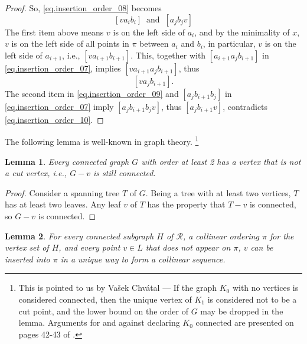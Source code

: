 \documentclass[12pt]{article}
\newtheorem{lem}{Lemma}
\begin{document}
\begin{proof}
So, \eqref{eq.insertion_order_08} becomes
\begin{equation}\label{eq.insertion_order_09}
[va_ib_i] \;\; \mbox{and} \;\; [a_jb_jv]
\end{equation}
The first item above means $v$ is on the left side of $a_i$,
and by the minimality of $x$, $v$ is on the left side of all points
in $\pi$ between $a_i$ and $b_i$,
in particular, $v$ is on the left side of $a_{i+1}$,
i.e.,
$[va_{i+1}b_{i+1}]$.
This, together with $[a_{i+1} a_j b_{i+1}]$ in \eqref{eq.insertion_order_07}, 
implies $[va_{i+1} a_j b_{i+1}]$, thus
\begin{equation}\label{eq.insertion_order_10}
[va_jb_{i+1}].
\end{equation}
The second item in \eqref{eq.insertion_order_09} and
$[a_jb_{i+1}b_j]$ in \eqref{eq.insertion_order_07}
imply $[a_j b_{i+1} b_j v]$, thus $[a_j b_{i+1} v]$, contradicts
\eqref{eq.insertion_order_10}.
\end{proof}

The following lemma is well-known in graph theory.
\footnote{
This is pointed to us by Va\v{s}ek Chv\'atal --- If the graph $K_0$ with no vertices is considered connected, 
then the unique vertex of $K_1$ is considered not to be a cut point,
and the lower bound on the order of $G$ may be dropped in the lemma.
Arguments for and against declaring $K_0$ connected are presented on pages 42-43 of
\cite{HR}.
}

\begin{lem}\label{lem.non_cut_point}
Every connected graph $G$ with order at least 2 has a vertex that is not a cut vertex,
i.e., $G - v$ is still connected.
\end{lem}

\begin{proof}
Consider a spanning tree $T$ of $G$.
Being a tree with at least two vertices,
$T$ has at least two leaves.
Any leaf $v$ of $T$ has the property that $T-v$ is connected,
so $G-v$ is connected.
\end{proof}

\begin{lem}\label{lem.insertion}
For every connected subgraph $H$ of $\mathcal{R}$,
a collinear ordering $\pi$ for the vertex set of $H$,
and every point $v \in L$ that does not appear on $\pi$,
$v$ can be inserted into $\pi$ in a unique way to form a collinear sequence.
\end{lem}
\end{document}
